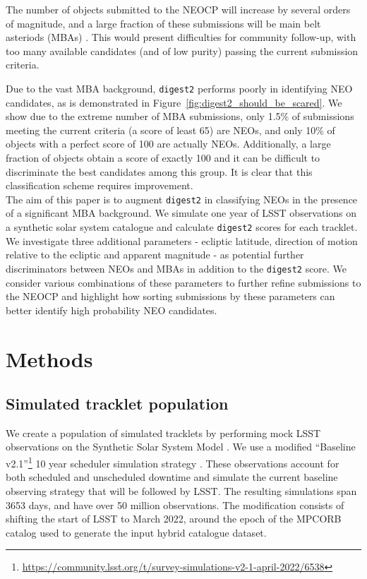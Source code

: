 \documentclass[preprint2, twocolappendix]{aastex631}
\newcommand{\dig}{\texttt{digest2}}
\begin{document}
The number of objects submitted to the NEOCP will increase by several orders of magnitude, and a large fraction of these submissions will be main belt asteriods (MBAs) \citep{sky-is-falling}. This would present difficulties for community follow-up, with too many available candidates (and of low purity) passing the current submission criteria.

Due to the vast MBA background, \dig{} performs poorly in identifying NEO candidates, as is demonstrated in Figure~\ref{fig:digest2_should_be_scared}. We show due to the extreme number of MBA submissions, only 1.5\% of submissions meeting the current criteria (a score of least 65) are NEOs, and only 10\% of objects with a perfect score of 100 are actually NEOs. Additionally, a large fraction of objects obtain a score of exactly 100 and it can be difficult to discriminate the best candidates among this group. It is clear that this classification scheme requires improvement.
\\

The aim of this paper is to augment \dig{} in classifying NEOs in the presence of a significant MBA background. We simulate one year of LSST observations on a synthetic solar system catalogue and calculate \dig{} scores for each tracklet. We investigate three additional parameters - ecliptic latitude, direction of motion relative to the ecliptic and apparent magnitude - as potential further discriminators between NEOs and MBAs in addition to the \dig{} score. We consider various combinations of these parameters to further refine submissions to the NEOCP and highlight how sorting submissions by these parameters can better identify high probability NEO candidates.

\section{Methods}

\subsection{Simulated tracklet population}

We create a population of simulated tracklets by performing mock LSST observations on the Synthetic Solar System Model \citep{Grav+2011}. We use a modified ``Baseline v2.1''\footnote{\url{https://community.lsst.org/t/survey-simulations-v2-1-april-2022/6538}} 10 year scheduler simulation strategy \citep{Naghib+2019, Cornwall+2020}. These observations account for both scheduled and unscheduled downtime and simulate the current baseline observing strategy that will be followed by LSST. The resulting simulations span 3653 days, and have over 50 million observations. The modification consists of shifting the start of LSST to March 2022, around the epoch of the MPCORB catalog used to generate the input hybrid catalogue dataset.
\end{document}
